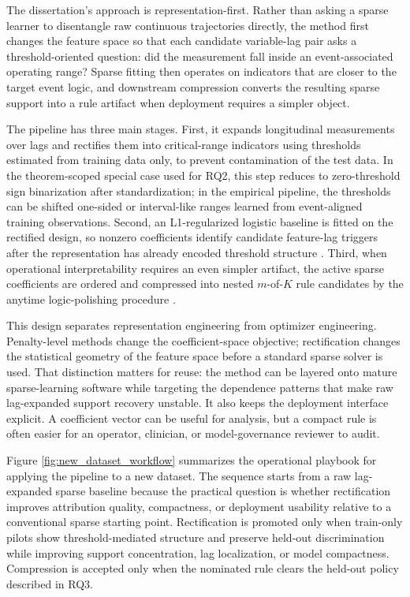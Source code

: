 The dissertation's approach is representation-first. Rather than asking a sparse learner to disentangle raw continuous trajectories directly, the method first changes the feature space so that each candidate variable-lag pair asks a threshold-oriented question: did the measurement fall inside an event-associated operating range? Sparse fitting then operates on indicators that are closer to the target event logic, and downstream compression converts the resulting sparse support into a rule artifact when deployment requires a simpler object.

The pipeline has three main stages. First, it expands longitudinal measurements over lags and rectifies them into critical-range indicators using thresholds estimated from training data only, to prevent contamination of the test data. In the theorem-scoped special case used for RQ2, this step reduces to zero-threshold sign binarization after standardization; in the empirical pipeline, the thresholds can be shifted one-sided or interval-like ranges learned from event-aligned training observations. Second, an L1-regularized logistic baseline is fitted on the rectified design, so nonzero coefficients identify candidate feature-lag triggers after the representation has already encoded threshold structure \autocites{tibshirani1996,fried2010,tay2023}. Third, when operational interpretability requires an even simpler artifact, the active sparse coefficients are ordered and compressed into nested $m$-of-$K$ rule candidates by the anytime logic-polishing procedure \autocite{JOrender2025Anytime}.

This design separates representation engineering from optimizer engineering. Penalty-level methods change the coefficient-space objective; rectification changes the statistical geometry of the feature space before a standard sparse solver is used. That distinction matters for reuse: the method can be layered onto mature sparse-learning software while targeting the dependence patterns that make raw lag-expanded support recovery unstable. It also keeps the deployment interface explicit. A coefficient vector can be useful for analysis, but a compact rule is often easier for an operator, clinician, or model-governance reviewer to audit.

Figure \ref{fig:new_dataset_workflow} summarizes the operational playbook for applying the pipeline to a new dataset. The sequence starts from a raw lag-expanded sparse baseline because the practical question is whether rectification improves attribution quality, compactness, or deployment usability relative to a conventional sparse starting point. Rectification is promoted only when train-only pilots show threshold-mediated structure and preserve held-out discrimination while improving support concentration, lag localization, or model compactness. Compression is accepted only when the nominated rule clears the held-out policy described in RQ3.

